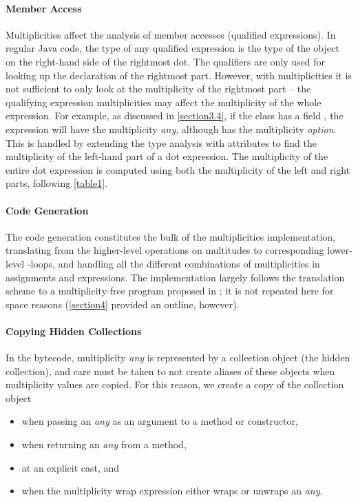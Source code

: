 {\paragraph{Member Access} Multiplicities affect the analysis of member accesses
(qualified expressions). In regular Java code, the type of any qualified
expression is the type of the object on the right-hand side of the rightmost
dot. The qualifiers are only used for looking up the declaration of the
rightmost part. However, with multiplicities it is not sufficient to only
look at the multiplicity of the rightmost part -- the qualifying expression
multiplicities may affect the multiplicity of the whole expression. For
example, as discussed in \autoref{section3.4}, if the  class has a field
, the expression  will have the
multiplicity \emph{any}, although  has the multiplicity \emph{option}. This
is handled by extending the type analysis with attributes to find the
multiplicity of the left-hand part of a dot expression. The multiplicity of the
entire dot expression is computed using both the multiplicity of the left and
right parts, following \autoref{table1}.

\paragraph{Code Generation} The code generation constitutes the bulk of the
multiplicities implementation, translating from the higher-level operations on
multitudes to corresponding lower-level -loops, and handling all
the different combinations of multiplicities in assignments and expressions.
The implementation largely follows the translation scheme to a
multiplicity-free program proposed in \cite{ref37}; it is not repeated here for
space reasons (\autoref{section4} provided an outline, however).

\paragraph{Copying Hidden Collections} In the bytecode, multiplicity \emph{any}
is represented by a collection object (the hidden
collection), and care must be taken to not create aliases of these objects when
multiplicity values are copied. For this reason, we create a copy of the
collection object

\begin{itemize}
  \item when passing an \emph{any} as an argument to a method or
    constructor,
  \item when returning an \emph{any} from a method,
  \item at an explicit  cast, and
  \item when the multiplicity wrap expression either wraps or unwraps an
    \emph{any}.
\end{itemize}

}
